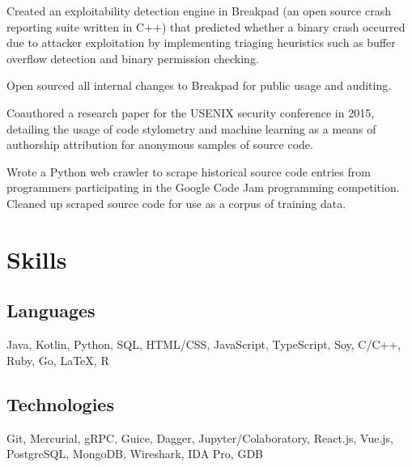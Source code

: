\documentclass[]{template}
\begin{document}
\sectionsep

\hfill
{}
\begin{tightemize}
\item
  Created an exploitability detection engine in Breakpad (an open source crash
  reporting suite written in C++) that predicted whether a binary crash occurred
  due to attacker exploitation by implementing triaging heuristics such as
  buffer overflow detection and binary permission checking.
\item
  Open sourced all internal changes to Breakpad for public usage and auditing.
\end{tightemize}

\sectionsep

\hfill
{}
\begin{tightemize}
\item
  Coauthored a research paper for the USENIX security conference in 2015,
  detailing the usage of code stylometry and machine learning as a means of
  authorship attribution for anonymous samples of source code.
\item
  Wrote a Python web crawler to scrape historical source code entries from
  programmers participating in the Google Code Jam programming competition.
  Cleaned up scraped source code for use as a corpus of training data.
\end{tightemize}

\section{Skills}

\subsection{Languages}
Java,
Kotlin,
Python,
SQL,
HTML/CSS,
JavaScript,
TypeScript,
Soy,
C/C++,
Ruby,
Go,
\LaTeX,
R

\sectionsep

\subsection{Technologies}
Git,
Mercurial,
gRPC,
Guice,
Dagger,
Jupyter/Colaboratory,
React.js,
Vue.js,
PostgreSQL,
MongoDB,
Wireshark,
IDA Pro,
GDB

\lastupdated
\end{document}
